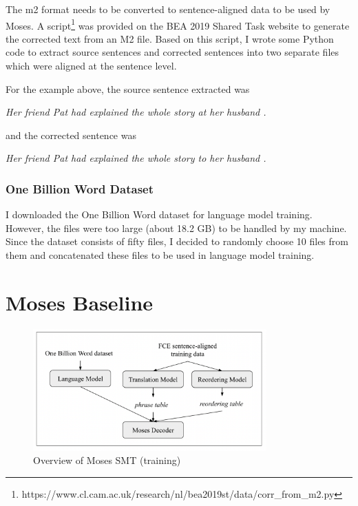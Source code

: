 \documentclass[12pt,a4paper,twoside]{report}
\begin{document}
The m2 format needs to be converted to sentence-aligned data to be used by Moses. A script\footnote{https://www.cl.cam.ac.uk/research/nl/bea2019st/data/corr\_from\_m2.py} was provided on the BEA 2019 Shared Task website to generate the corrected text from an M2 file. Based on this script, I wrote some Python code to extract source sentences and corrected sentences into two separate files which were aligned at the sentence level.

For the example above, the source sentence extracted was
\begin{center}
\textit{Her friend Pat had explained the whole story at her husband .}
\end{center}

and the corrected sentence was
\begin{center}
\textit{Her friend Pat had explained the whole story to her husband .}
\end{center}

\subsubsection{One Billion Word Dataset}

I downloaded the One Billion Word dataset for language model training. However, the files were too large (about 18.2 GB) to be handled by my machine. Since the dataset consists of fifty files, I decided to randomly choose 10 files from them and concatenated these files to be used in language model training.


\section{Moses Baseline} \label{section:moses_baseline}

\begin{figure}[ht]
\centering
\includegraphics[width=0.8\textwidth]{images/moses_pipeline.png}
\caption{Overview of Moses SMT (training)}
\label{fig:moses_pipeline}
\end{figure}
\end{document}
